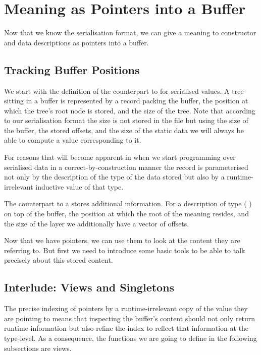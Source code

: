 \section{Meaning as Pointers into a Buffer}\label{sec:pointers}

Now that we know the serialisation format, we can give a meaning
to constructor and data descriptions as pointers into a buffer.

\subsection{Tracking Buffer Positions}

We start with the definition of the counterpart to 
for serialised values. A tree sitting in a buffer is represented
by a record packing the buffer, the position at which the tree's
root node is stored, and the size of the tree.
%
Note that according to our serialisation format the size is not stored
in the file but using the size of the buffer, the stored offsets,
and the size of the static data we will always
be able to compute a value corresponding to it.


For reasons that will become apparent in 
when we start programming over serialised data in a correct-by-construction
manner the record  is parameterised not only by the description
of the type of the data stored but also by a runtime-irrelevant inductive value of
that type.


The counterpart to a  stores additional information.
For a description of type (   )
on top of the buffer, the position at which the root of the meaning resides,
and the size of the layer we additionally have a vector of  offsets.

Now that we have pointers, we can use them to look at the content
they are referring to. But first we need to introduce some basic tools
to be able to talk precisely about this stored content.

\subsection{Interlude: Views and Singletons}

The precise indexing of pointers by a runtime-irrelevant copy of the value
they are pointing to means that inspecting the buffer's content should
not only return runtime information but also refine the index to reflect
that information at the type-level.
%
As a consequence, the functions we are going to define in the following
subsections are views.


